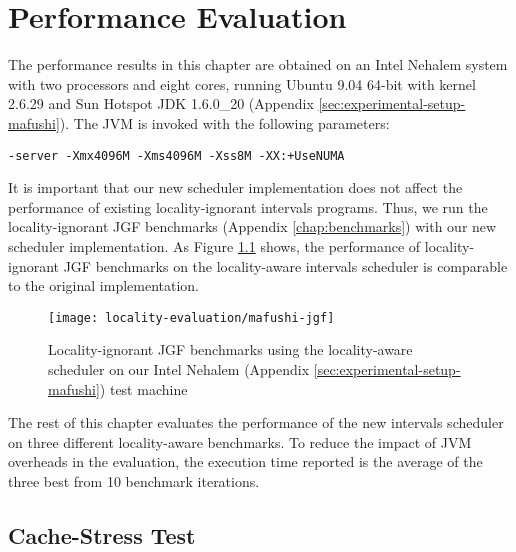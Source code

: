 
\chapter{Performance Evaluation}
\label{chap:locality-performance}

The performance results in this chapter are obtained on an Intel
Nehalem system with two processors and eight cores, running Ubuntu
9.04 64-bit with kernel 2.6.29 and Sun Hotspot JDK 1.6.0\_20 (Appendix
\ref{sec:experimental-setup-mafushi}). The JVM is invoked with the
following parameters:

\begin{lstlisting}[style=Listing]
  -server -Xmx4096M -Xms4096M -Xss8M -XX:+UseNUMA
\end{lstlisting}

It is important that our new scheduler implementation does not affect
the performance of existing locality-ignorant intervals
programs. Thus, we run the locality-ignorant JGF benchmarks (Appendix
\ref{chap:benchmarks}) with our new scheduler implementation. As
Figure \ref{fig:locality-evaluation-jgf} shows, the performance of
locality-ignorant JGF benchmarks on the locality-aware intervals
scheduler is comparable to the original implementation.

\begin{figure}[!ht]
  \centering
  \texttt{[image: locality-evaluation/mafushi-jgf]}
  \caption[Locality-ignorant JGF benchmarks running on locality-aware
  scheduler]{Locality-ignorant JGF benchmarks using the locality-aware
    scheduler on our Intel Nehalem (Appendix
    \ref{sec:experimental-setup-mafushi}) test machine}
  \label{fig:locality-evaluation-jgf}
\end{figure}

The rest of this chapter evaluates the performance of the new
intervals scheduler on three different locality-aware benchmarks. To
reduce the impact of JVM overheads in the evaluation, the execution
time reported is the average of the three best from 10 benchmark
iterations.

\section{Cache-Stress Test}
\label{sec:locality-performance-cache-stress-test}


